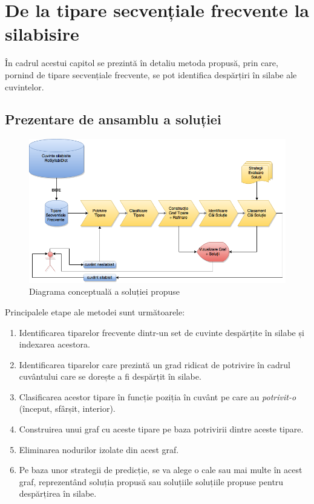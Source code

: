 \chapter{De la tipare secvențiale frecvente la silabisire}
\label{cap:contributii}

În cadrul acestui capitol se prezintă în detaliu metoda propusă, prin care, pornind de tipare secvențiale frecvente, se pot identifica despărțiri în silabe ale cuvintelor.  

\section{Prezentare de ansamblu a soluției}

\begin{figure}[h]
    \centering
    \includegraphics[width=\textwidth]{figures/rosil-flow.png}
    \caption{Diagrama conceptuală a soluției propuse}
    \label{fig:rosil-flow}
\end{figure}

Principalele etape ale metodei sunt următoarele:
\begin{enumerate}
\item Identificarea tiparelor frecvente dintr-un set de cuvinte despărțite în silabe și indexarea acestora.
\item Identificarea tiparelor care prezintă un grad ridicat de potrivire în cadrul cuvântului care se dorește a fi despărțit în silabe.
\item Clasificarea acestor tipare în funcție poziția în cuvânt pe care au \textit{potrivit-o} (început, sfârșit, interior).
\item Construirea unui graf cu aceste tipare pe baza potrivirii dintre aceste tipare.
\item Eliminarea nodurilor izolate din acest graf.
\item Pe baza unor strategii de predicție, se va alege o cale sau mai multe în acest graf, reprezentând soluția propusă sau soluțiile soluțiile propuse pentru despărțirea în silabe.
\end{enumerate}

